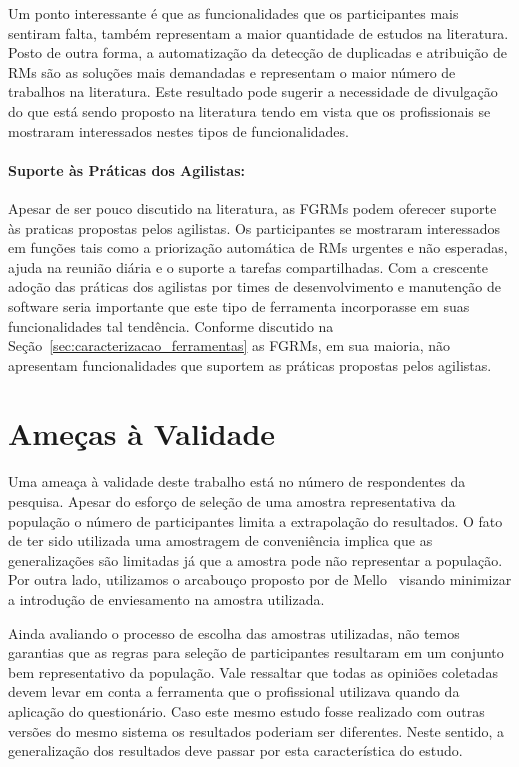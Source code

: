 Um ponto interessante é que as funcionalidades que os participantes mais
sentiram falta, também representam a maior quantidade de estudos na literatura.
Posto de outra forma, a automatização da detecção de duplicadas e atribuição de
RMs são as soluções mais demandadas e representam o maior número de trabalhos na
literatura. Este resultado pode sugerir a necessidade de divulgação do que está
sendo proposto na literatura tendo em vista que os profissionais se mostraram
interessados nestes tipos de funcionalidades.

\paragraph{Suporte às Práticas dos Agilistas:}
\label{par:pesq_profissionais_suporte_pratica_agilistas}

Apesar de ser pouco discutido na literatura, as FGRMs podem oferecer suporte às
praticas propostas pelos agilistas. Os participantes se mostraram interessados
em funções tais como a priorização automática de RMs urgentes e não esperadas,
ajuda na reunião diária e o suporte a tarefas compartilhadas. Com a crescente
adoção das práticas dos agilistas por times de desenvolvimento e manutenção de
software seria importante que este tipo de ferramenta incorporasse em suas
funcionalidades tal tendência. Conforme discutido na
Seção~\ref{sec:caracterizacao_ferramentas} as FGRMs, em sua maioria, não
apresentam funcionalidades que suportem as práticas propostas pelos agilistas.

\section{Ameças à Validade}
\label{sec:pesquisa_profissionais_ameacas_validade}

Uma ameaça à validade deste trabalho está no número de respondentes da pesquisa.
Apesar do esforço de seleção de uma amostra representativa da população o número
de participantes limita a extrapolação do resultados. O fato de ter sido
utilizada uma amostragem de conveniência implica que as generalizações são
limitadas já que a amostra pode não representar a população. Por outra lado,
utilizamos o arcabouço proposto por de Mello~\cite{de2014towards} visando
minimizar a introdução de enviesamento na amostra utilizada.

Ainda avaliando o processo de escolha das amostras utilizadas, não temos
garantias que as regras para seleção de participantes resultaram em um conjunto
bem representativo da população. Vale ressaltar que todas as opiniões coletadas
devem levar em conta a ferramenta que o profissional utilizava quando da
aplicação do questionário. Caso este mesmo estudo fosse realizado com outras
versões do mesmo sistema os resultados poderiam ser diferentes. Neste sentido, a
generalização dos resultados deve passar por esta característica do estudo.

